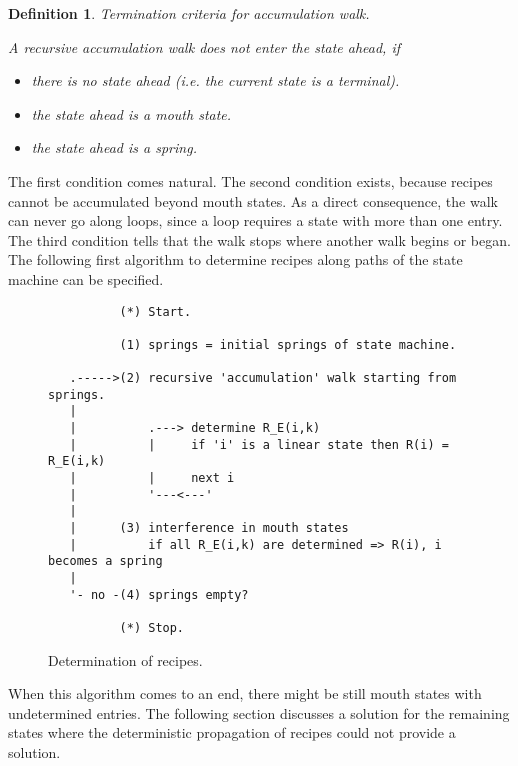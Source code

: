\documentclass[12pt,a4paper]{scrartcl}
\newtheorem{definition}{Definition}
\begin{document}
\begin{definition}
Termination criteria for accumulation walk.

A recursive accumulation walk does not enter the state ahead, if 

\begin{itemize}
    \item there is no state ahead (i.e. the current state is a terminal).
    \item the state ahead is a mouth state.
    \item the state ahead is a spring.
\end{itemize}
\end{definition}

The first condition comes natural. The second condition exists, because recipes
cannot be accumulated beyond mouth states. As a direct consequence, the walk
can never go along loops, since a loop requires a state with more than one
entry. The third condition tells that the walk stops where another walk begins
or began.  The following first algorithm to determine recipes along paths of
the state machine can be specified.

\begin{figure}[htbp] \leavevmode
\begin{verbatim}
          (*) Start.
   
          (1) springs = initial springs of state machine.

   .----->(2) recursive 'accumulation' walk starting from springs.
   |
   |          .---> determine R_E(i,k) 
   |          |     if 'i' is a linear state then R(i) = R_E(i,k)
   |          |     next i
   |          '---<---'
   |
   |      (3) interference in mouth states 
   |          if all R_E(i,k) are determined => R(i), i becomes a spring
   |
   '- no -(4) springs empty?

          (*) Stop.
\end{verbatim}

\caption{Determination of recipes.}
\end{figure}

When this algorithm comes to an end, there might be still mouth states with
undetermined entries.  The following section discusses a solution for the
remaining states where the deterministic propagation of recipes could not
provide a solution.

%
\end{document}
